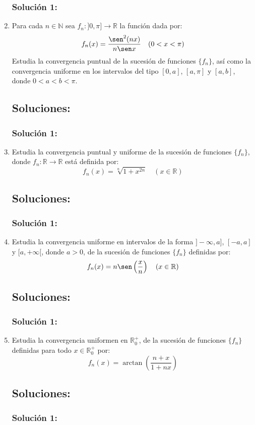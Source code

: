 \documentclass[a4paper, 11pt]{article} %
\begin{document}
\begin{enumerate}
		\subsubsection*{Solución 1:}
	
	\item Para cada $n \in \mathbb{N}$ sea $f_n: ]0, \pi] \rightarrow \mathbb{R}$ la función dada por:
	$$f_n(x) = \frac{\sen^2(nx)}{n\sen x} \quad (0 < x < \pi)$$
	Estudia la convergencia puntual de la sucesión de funciones $\{f_n\}$, así como la convergencia
	uniforme en los intervalos del tipo $[0, a]$, $[a,\pi]$ y $[a,b]$, donde $0 < a < b < \pi$.
	\subsection*{Soluciones:}
		\subsubsection*{Solución 1:}
	
	\item Estudia la convergencia puntual y uniforme de la sucesión de funciones $\{f_n\}$, donde
	$f_n: \mathbb{R} \rightarrow \mathbb{R}$ está definida por:
	$$f_n(x) = \sqrt[n]{1+x^{2n}} \quad (x \in \mathbb{R})$$
	\subsection*{Soluciones:}
		\subsubsection*{Solución 1:}
	
	\item Estudia la convergencia uniforme en intervalos de la forma $]-\infty, a]$, $[-a,a]$ y
	$[a, +\infty[$, donde $a > 0$, de la sucesión de funciones $\{f_n\}$ definidas por:
	$$f_n(x) = n\sen\left(\frac{x}{n}\right) \quad (x \in \mathbb{R})$$
	\subsection*{Soluciones:}
		\subsubsection*{Solución 1:}
	
	\item Estudia la convergencia uniformen en $\mathbb{R}^+_0$, de la sucesión de funciones $\{f_n\}$
	definidas para todo $x \in \mathbb{R}^+_0$ por:
	$$f_n(x) = \arctan\left(\frac{n+x}{1+nx}\right)$$
	\subsection*{Soluciones:}
		\subsubsection*{Solución 1:}
\end{enumerate}
\end{document}
